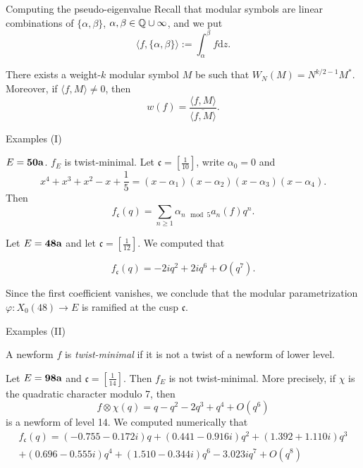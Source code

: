\documentclass[handout]{beamer}
\newcommand{\fc}{\mathfrak{c}}
\begin{document}
\begin{frame}{Computing the pseudo-eigenvalue}
Recall that modular symbols are linear combinations of $\{\alpha, \beta\}$, $\alpha, \beta \in \mathbb{Q} \cup \infty$, 
and we put 
\[
	\langle f, \{\alpha, \beta\} \rangle := \int_{\alpha}^{\beta} f \textrm{d} z. 
\]
\begin{Lemma}[C.]
There exists a weight-$k$ modular symbol $M$ be such that $W_N(M) = N^{k/2 -1} M^*$. Moreover, if $\langle f, M \rangle \neq 0$, then 
\[
	w(f) = \frac{\langle f,M \rangle }{\overline{\langle f,M \rangle}}.
\]
\end{Lemma} 

\end{frame}

\begin{frame}{Examples (I)}

\begin{Example}
$E = {\bf 50a}$. $f_E$ is twist-minimal. Let  $\fc = [\frac{1}{10}]$, write $\alpha_0 = 0$ and 
\[
	x^4 + x^3 + x^2 - x + \frac{1}{5} = (x-\alpha_1) (x-\alpha_2)(x-\alpha_3)(x-\alpha_4).
\]
Then 
\[
	f_{\fc}(q) = \sum_{n \geq 1}  \alpha_{n \mod 5} a_n(f) q^n.
\]
\end{Example}

\begin{Example}
Let $E = {\bf 48a}$ and let $\fc = \left[\frac{1}{12}\right]$.  We computed that 

$$f_\fc(q) =  -2iq^2 + 2iq^6 + O(q^7).$$

Since the first coefficient vanishes, we conclude that the modular parametrization $\varphi: X_0(48) \to E$ is ramified at the cusp $\fc$. 
\end{Example}
\end{frame}


\begin{frame}{Examples (II)}
\begin{Definition}
A newform $f$ is {\it twist-minimal} if it is not a twist of a newform of lower level. 
\end{Definition}
\begin{Example}
Let $E = {\bf 98a}$ and $\fc = [\frac{1}{14}]$. Then $f_E$ is not twist-minimal. More precisely, if $\chi$ is the quadratic character modulo 7, then 
\[
	f \otimes \chi  (q) =  q - q^2 - 2q^3 + q^4 + O(q^6)
\] 
is a newform of level 14.  We computed numerically that 
{\footnotesize
\begin{align*}
f_\fc(q) = \left(-0.755 - 0.172i\right)q + \left(0.441 - 0.916i\right)q^{2} 
+ \left(1.392+ 1.110i\right)q^{3} \\ + \left(0.696 - 0.555i\right)q^{4} 
+ \left(1.510 - 0.344i\right)q^{6} - 3.023i q^{7} + O(q^8) 
\end{align*}
}
\end{Example}
\end{frame}
\end{document}

